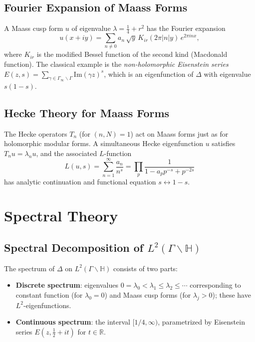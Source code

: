 \documentclass[12pt,a4paper]{amsart}
\theoremstyle{definition}
\newcommand{\HH}{\mathbb{H}}
\newcommand{\RR}{\mathbb{R}}
\newcommand{\im}{\mathrm{Im}}
\begin{document}
\subsection{Fourier Expansion of Maass Forms}

A Maass cusp form $u$ of eigenvalue $\lambda = \frac{1}{4}+r^2$ has the Fourier expansion
\[
u(x+iy) = \sum_{n \neq 0} a_n\, \sqrt{y}\, K_{ir}(2\pi|n|y)\, e^{2\pi i n x},
\]
where $K_{ir}$ is the modified Bessel function of the second kind (Macdonald function).
The classical example is the \emph{non-holomorphic Eisenstein series}
$E(z,s) = \sum_{\gamma \in \Gamma_\infty \backslash \Gamma} \im(\gamma z)^s$,
which is an eigenfunction of $\Delta$ with eigenvalue $s(1-s)$.

\subsection{Hecke Theory for Maass Forms}

The Hecke operators $T_n$ (for $(n,N)=1$) act on Maass forms just as for holomorphic
modular forms. A simultaneous Hecke eigenfunction $u$ satisfies $T_n u = \lambda_n u$,
and the associated $L$-function
\[
L(u, s) = \sum_{n=1}^\infty \frac{a_n}{n^s} = \prod_p \frac{1}{1 - a_p p^{-s} + p^{-2s}}
\]
has analytic continuation and functional equation $s \leftrightarrow 1-s$.

\section{Spectral Theory}
\label{sec:spectral}

\subsection{Spectral Decomposition of \texorpdfstring{$L^2(\Gamma \backslash \HH)$}{L2}}

The spectrum of $\Delta$ on $L^2(\Gamma \backslash \HH)$ consists of two parts:
\begin{itemize}
\item \textbf{Discrete spectrum}: eigenvalues $0 = \lambda_0 < \lambda_1 \leq \lambda_2 \leq \cdots$
  corresponding to constant function (for $\lambda_0 = 0$) and Maass cusp forms
  (for $\lambda_j > 0$); these have $L^2$-eigenfunctions.
\item \textbf{Continuous spectrum}: the interval $[1/4, \infty)$, parametrized by
  Eisenstein series $E(z, \tfrac{1}{2}+it)$ for $t \in \RR$.
\end{itemize}
\end{document}
